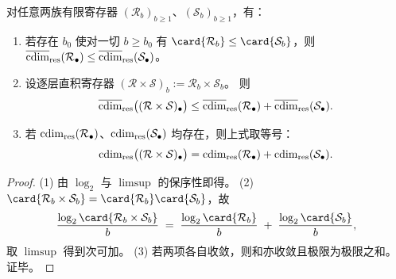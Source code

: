 \begin{proposition}[单调性与乘积次可加]\label{prop:cdim-residual-circle-dimension-laws}
对任意两族有限寄存器 \((\mathcal{R}_b)_{b\ge 1}\)、\((\mathcal{S}_b)_{b\ge 1}\)，有：
\begin{enumerate}
  \item 若存在 \(b_0\) 使对一切 \(b\ge b_0\) 有 \(\card{\mathcal{R}_b}\le \card{\mathcal{S}_b}\)，则
  \(
  \overline{\operatorname{cdim}}_{\mathrm{res}}(\mathcal{R}_\bullet)\le \overline{\operatorname{cdim}}_{\mathrm{res}}(\mathcal{S}_\bullet)
  \)。
  \item 设逐层直积寄存器 \((\mathcal{R}\times\mathcal{S})_b:=\mathcal{R}_b\times\mathcal{S}_b\)。
  则
  \[
  \overline{\operatorname{cdim}}_{\mathrm{res}}\bigl((\mathcal{R}\times\mathcal{S})_\bullet\bigr)
  \le
  \overline{\operatorname{cdim}}_{\mathrm{res}}(\mathcal{R}_\bullet)+\overline{\operatorname{cdim}}_{\mathrm{res}}(\mathcal{S}_\bullet).
  \]
  \item 若 \(\operatorname{cdim}_{\mathrm{res}}(\mathcal{R}_\bullet)\)、\(\operatorname{cdim}_{\mathrm{res}}(\mathcal{S}_\bullet)\) 均存在，则上式取等号：
  \[
  \operatorname{cdim}_{\mathrm{res}}\bigl((\mathcal{R}\times\mathcal{S})_\bullet\bigr)
  =
  \operatorname{cdim}_{\mathrm{res}}(\mathcal{R}_\bullet)+\operatorname{cdim}_{\mathrm{res}}(\mathcal{S}_\bullet).
  \]
\end{enumerate}
\end{proposition}
\begin{proof}
(1) 由 \(\log_2\) 与 \(\limsup\) 的保序性即得。
(2) \(\card{\mathcal{R}_b\times\mathcal{S}_b}=\card{\mathcal{R}_b}\card{\mathcal{S}_b}\)，故
\[
\frac{\log_2\card{\mathcal{R}_b\times\mathcal{S}_b}}{b}
\;=\;
\frac{\log_2\card{\mathcal{R}_b}}{b}
\;+\;
\frac{\log_2\card{\mathcal{S}_b}}{b},
\]
取 \(\limsup\) 得到次可加。
(3) 若两项各自收敛，则和亦收敛且极限为极限之和。证毕。
\end{proof}



